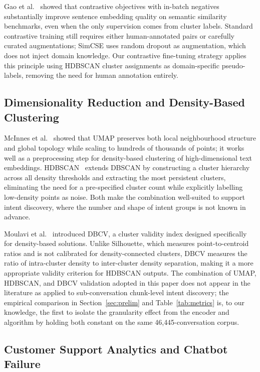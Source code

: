 \documentclass[conference]{IEEEtran}
\begin{document}
Gao et al.~\cite{gao2021simcse} showed that contrastive objectives with in-batch negatives substantially improve sentence embedding quality on semantic similarity benchmarks, even when the only supervision comes from cluster labels. Standard contrastive training still requires either human-annotated pairs or carefully curated augmentations; SimCSE uses random dropout as augmentation, which does not inject domain knowledge. Our contrastive fine-tuning strategy applies this principle using HDBSCAN cluster assignments as domain-specific pseudo-labels, removing the need for human annotation entirely.

\subsection{Dimensionality Reduction and Density-Based Clustering}

McInnes et al.~\cite{mcinnes2018umap} showed that UMAP preserves both local neighbourhood structure and global topology while scaling to hundreds of thousands of points; it works well as a preprocessing step for density-based clustering of high-dimensional text embeddings. HDBSCAN~\cite{campello2013density} extends DBSCAN by constructing a cluster hierarchy across all density thresholds and extracting the most persistent clusters, eliminating the need for a pre-specified cluster count while explicitly labelling low-density points as noise. Both make the combination well-suited to support intent discovery, where the number and shape of intent groups is not known in advance.

Moulavi et al.~\cite{moulavi2014dbcv} introduced DBCV, a cluster validity index designed specifically for density-based solutions. Unlike Silhouette, which measures point-to-centroid ratios and is not calibrated for density-connected clusters, DBCV measures the ratio of intra-cluster density to inter-cluster density separation, making it a more appropriate validity criterion for HDBSCAN outputs. The combination of UMAP, HDBSCAN, and DBCV validation adopted in this paper does not appear in the literature as applied to sub-conversation chunk-level intent discovery; the empirical comparison in Section~\ref{sec:prelim} and Table~\ref{tab:metrics} is, to our knowledge, the first to isolate the granularity effect from the encoder and algorithm by holding both constant on the same 46{,}445-conversation corpus.

\subsection{Customer Support Analytics and Chatbot Failure}
\end{document}
